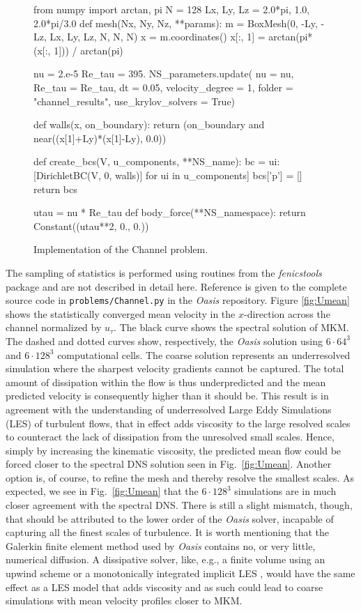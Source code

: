 \documentclass[final,3p,times,twocolumn]{elsarticle}
\newcommand{\inpyth}{\lstinline[style=inlinestyle]} %[]%
\newcounter{bla}
\begin{document}
\begin{figure}[t!]
\begin{python}[t!]
from numpy import arctan, pi
N = 128
Lx, Ly, Lz = 2.0*pi, 1.0, 2.0*pi/3.0
def mesh(Nx, Ny, Nz, **params):
    m = BoxMesh(0, -Ly, -Lz, Lx, Ly, Lz,
                N, N, N)
    x = m.coordinates()
    x[:, 1] = arctan(pi*(x[:, 1])) / arctan(pi)

nu = 2.e-5
Re_tau = 395.
NS_parameters.update(
  nu = nu,
  Re_tau = Re_tau,
  dt = 0.05,
  velocity_degree = 1,
  folder = "channel_results",
  use_krylov_solvers = True)

def walls(x, on_boundary):
    return (on_boundary and
            near((x[1]+Ly)*(x[1]-Ly), 0.0))

def create_bcs(V, u_components, **NS_name):
    bc = {ui: [DirichletBC(V, 0, walls)]
               for ui in u_components]}
    bcs['p'] = []
    return bcs

utau = nu * Re_tau
def body_force(**NS_namespace):
    return Constant((utau**2, 0., 0.))
\end{python}
\caption{Implementation of the Channel problem.}
\label{fig:channel}
\end{figure}
The sampling of statistics is performed using routines from the  \emph{fenicstools} \cite{fenicstools} package and are not described in detail here. Reference is given to the complete source code in \inpyth{problems/Channel.py} in the \emph{Oasis} repository. Figure \ref{fig:Umean} shows the statistically converged mean velocity in the $x$-direction across the channel normalized by $u_{\tau}$. The black curve shows the spectral solution of MKM. The dashed and dotted curves show, respectively, the \emph{Oasis} solution using $6\cdot 64^3$ and $6\cdot 128^3$ computational cells. The coarse solution represents an underresolved simulation where the sharpest velocity gradients cannot be captured. The total amount of dissipation within the flow is thus underpredicted and the mean predicted velocity is consequently higher than it should be. This result is in agreement with the understanding of underresolved Large Eddy Simulations (LES) of turbulent flows, that in effect adds viscosity to the large resolved scales to counteract the lack of dissipation from the unresolved small scales. Hence, simply by increasing the kinematic viscosity, the predicted mean flow could be forced closer to the spectral DNS solution seen in Fig.~\ref{fig:Umean}. Another option is, of course, to refine the mesh and thereby resolve the smallest scales. As expected, we see in Fig.~\ref{fig:Umean} that the $6\cdot 128^3$ simulations are in much closer agreement with the spectral DNS. There is still a slight mismatch, though, that should be attributed to the lower order of the \emph{Oasis} solver, incapable of capturing all the finest scales of turbulence. It is worth mentioning that the Galerkin finite element method used by \emph{Oasis} contains no, or very little, numerical diffusion. A dissipative solver, like, e.g., a finite volume using an upwind scheme or a monotonically integrated implicit LES \cite{fureby99}, would have the same effect as a LES model that adds viscosity and as such could lead to coarse simulations with mean velocity profiles closer to MKM.
\end{document}

